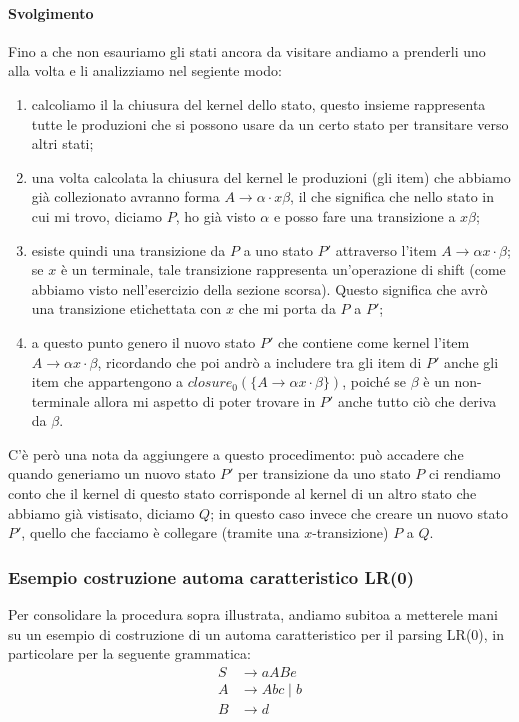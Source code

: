 \documentclass[class=book, crop=false, oneside, 12pt]{standalone}
\begin{document}
\paragraph{Svolgimento}
Fino a che non esauriamo gli stati ancora da visitare andiamo a prenderli uno alla volta e li analizziamo nel segiente modo:
\begin{enumerate}
    \item calcoliamo il la chiusura del kernel dello stato, questo insieme rappresenta tutte le produzioni che si possono usare da un certo stato per transitare verso altri stati;
    \item una volta calcolata la chiusura del kernel le produzioni (gli item) che abbiamo già collezionato avranno forma \(A \to \alpha \cdot x \beta\), il che significa che nello stato in cui mi trovo, diciamo \(P\), ho già visto \(\alpha\) e posso fare una transizione a \(x\beta\);
    \item esiste quindi una transizione da \(P\) a uno stato \(P'\) attraverso l'item \(A \to \alpha x \cdot \beta\); se \(x\) è un terminale, tale transizione rappresenta un'operazione di shift (come abbiamo visto nell'esercizio della sezione scorsa). Questo significa che avrò una transizione etichettata con \(x\) che mi porta da \(P\) a \(P'\);
    \item a questo punto genero il nuovo stato \(P'\) che contiene come kernel l'item \(A \to \alpha x \cdot \beta\), ricordando che poi andrò a includere tra gli item di \(P'\) anche gli item che appartengono a \(closure_0 (\{ A \to \alpha x \cdot \beta \})\), poiché se \(\beta\) è un non-terminale allora mi aspetto di poter trovare in \(P'\) anche tutto ciò che deriva da \(\beta\).
\end{enumerate}
C'è però una nota da aggiungere a questo procedimento: può accadere che quando generiamo un nuovo stato \(P'\) per transizione da uno stato \(P\) ci rendiamo conto che il kernel di questo stato corrisponde al kernel di un altro stato che abbiamo già vistisato, diciamo \(Q\); in questo caso invece che creare un nuovo stato \(P'\), quello che facciamo è collegare (tramite una \(x\)-transizione) \(P\) a \(Q\).

\subsubsection{Esempio costruzione automa caratteristico LR(0)}
\label{esercizio_costruzione_automa_lr0}
Per consolidare la procedura sopra illustrata, andiamo subitoa a metterele mani su un esempio di costruzione di un automa caratteristico per il parsing LR(0), in particolare per la seguente grammatica:
\begin{align*}
    S &\to aABe \\
    A &\to Abc \mid b \\
    B &\to d
\end{align*}
\end{document}
